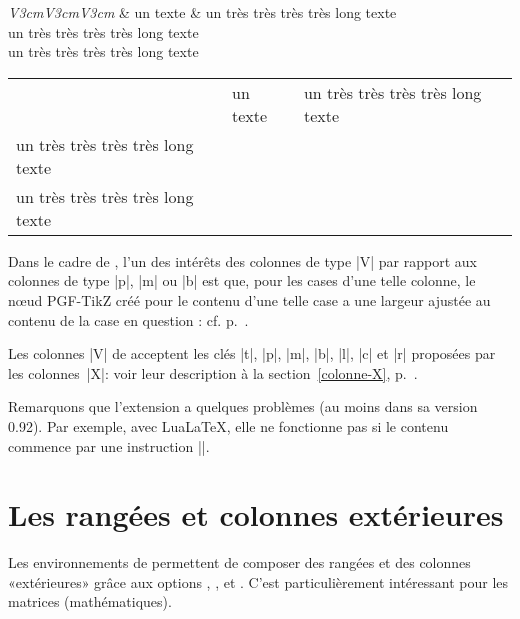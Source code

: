 \documentclass[dvipsnames]{article}%
\begin{document}
\medskip
\begin{Code}
\begin{NiceTabular}[corners=NW,hvlines]{\emph{V{3cm}V{3cm}V{3cm}}}
& un texte & un très très très très long texte \\
un très très très très long texte \\
un très très très très long texte 
\end{NiceTabular}
\end{Code}

\medskip
\begin{center}
\begin{NiceTabular}[corners=NW,hvlines]{V{3cm}V{3cm}V{3cm}}
& un texte & un très très très très long texte \\
un très très très très long texte \\
un très très très très long texte 
\end{NiceTabular}
\end{center}


Dans le cadre de
, l'un des intérêts des colonnes de type |V| par rapport aux
colonnes de type |p|, |m| ou |b| est que, pour les cases d'une telle colonne,
le nœud PGF-TikZ créé pour le contenu d'une telle case a une largeur ajustée
au contenu de la case en question : cf. p.~\pageref{node-V}. 


\medskip
Les colonnes |V| de  acceptent les clés |t|, |p|, |m|, |b|, |l|,
|c| et |r| proposées par les colonnes~|X|: voir leur description à la section~\ref{colonne-X},
p.~\pageref{colonne-X}. 

\medskip
Remarquons que l'extension  a quelques problèmes (au moins dans sa
version 0.92). Par exemple, avec LuaLaTeX, elle ne fonctionne pas si le contenu
commence par une instruction |\color|.


\medskip
\section{Les rangées et colonnes extérieures}


Les environnements de  permettent de composer des rangées et des
colonnes «extérieures» grâce aux options ,
,  et . C'est
particulièrement intéressant pour les matrices (mathématiques).
\label{exterior}
\end{document}
